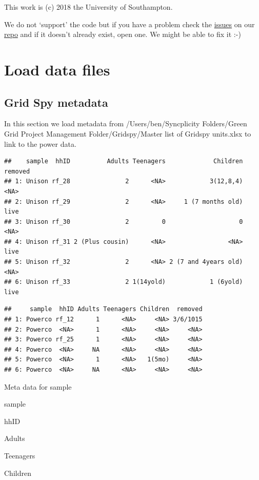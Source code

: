 \documentclass[]{article}
\begin{document}
This work is (c) 2018 the University of Southampton.

We do not `support' the code but if you have a problem check the
\href{https://git.soton.ac.uk/ba1e12/nzGREENGrid/issues}{issues} on our
\href{https://git.soton.ac.uk/ba1e12/nzGREENGrid}{repo} and if it
doesn't already exist, open one. We might be able to fix it :-)

\section{Load data files}\label{load-data-files}

\subsection{Grid Spy metadata}\label{grid-spy-metadata}

In this section we load metadata from /Users/ben/Syncplicity
Folders/Green Grid Project Management Folder/Gridspy/Master list of
Gridspy units.xlsx to link to the power data.

\begin{verbatim}
##    sample  hhID          Adults Teenagers             Children removed
## 1: Unison rf_28               2      <NA>            3(12,8,4)    <NA>
## 2: Unison rf_29               2      <NA>     1 (7 months old)    live
## 3: Unison rf_30               2         0                    0    <NA>
## 4: Unison rf_31 2 (Plus cousin)      <NA>                 <NA>    live
## 5: Unison rf_32               2      <NA> 2 (7 and 4years old)    <NA>
## 6: Unison rf_33               2 1(14yold)            1 (6yold)    live
\end{verbatim}

\begin{verbatim}
##     sample  hhID Adults Teenagers Children  removed
## 1: Powerco rf_12      1      <NA>     <NA> 3/6/1015
## 2: Powerco  <NA>      1      <NA>     <NA>     <NA>
## 3: Powerco rf_25      1      <NA>     <NA>     <NA>
## 4: Powerco  <NA>     NA      <NA>     <NA>     <NA>
## 5: Powerco  <NA>      1      <NA>   1(5mo)     <NA>
## 6: Powerco  <NA>     NA      <NA>     <NA>     <NA>
\end{verbatim}

Meta data for sample

sample

hhID

Adults

Teenagers

Children
\end{document}
